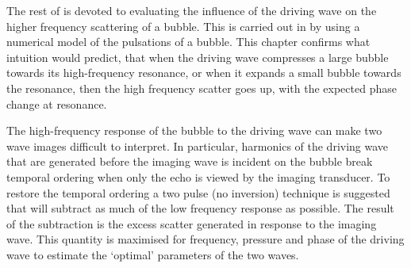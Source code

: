 



The rest of  is devoted to evaluating the influence
of the driving wave on the higher frequency scattering of a bubble.
This is carried out in 
by using a numerical model of the pulsations of a bubble.
This chapter confirms what intuition would predict, 
that when the driving wave compresses a large bubble towards its high-frequency resonance, 
or when it expands a small bubble towards the  resonance, then the high frequency scatter goes up,
with the expected phase change at resonance.

The high-frequency response of the bubble to the driving wave can make two wave images difficult to interpret.
In particular, harmonics of the driving wave that are generated before the imaging wave is incident on the bubble
break temporal ordering when only the echo is viewed by the imaging transducer.
To restore the temporal ordering a two pulse (no inversion) technique is suggested that will subtract as much of the low frequency response as possible.
The result of the subtraction is the excess scatter generated in response to the imaging wave.
This quantity is maximised for frequency, pressure and phase of the driving wave to estimate the `optimal' parameters of the two waves.


